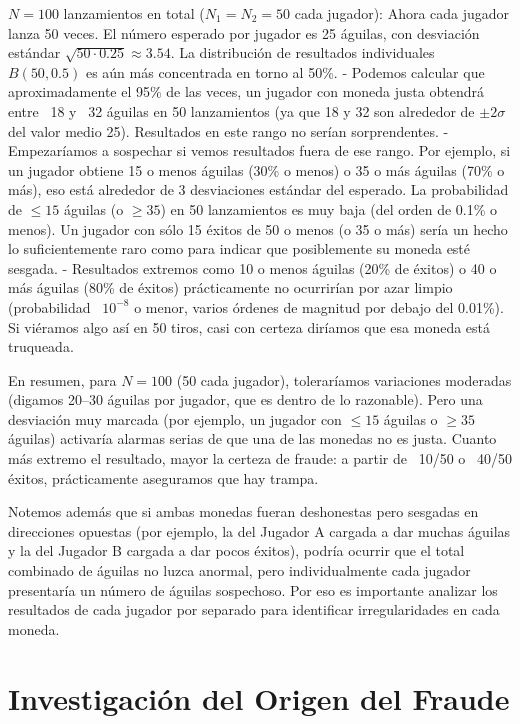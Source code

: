 \documentclass[11pt,letterpaper]{article}
\begin{document}
$N=100$ lanzamientos en total ($N_1=N_2=50$ cada jugador): Ahora cada jugador lanza 50 veces. El número esperado por jugador es 25 águilas, con desviación estándar $\sqrt{50 \cdot 0.25} \approx 3.54$. La distribución de resultados individuales $B(50,0.5)$ es aún más concentrada en torno al 50\%. 
    - Podemos calcular que aproximadamente el 95\% de las veces, un jugador con moneda justa obtendrá entre ~18 y ~32 águilas en 50 lanzamientos (ya que 18 y 32 son alrededor de $\pm2\sigma$ del valor medio 25). Resultados en este rango no serían sorprendentes.
    - Empezaríamos a sospechar si vemos resultados fuera de ese rango. Por ejemplo, si un jugador obtiene 15 o menos águilas (30\% o menos) o 35 o más águilas (70\% o más), eso está alrededor de 3 desviaciones estándar del esperado. La probabilidad de $\le15$ águilas (o $\ge35$) en 50 lanzamientos es muy baja (del orden de 0.1\% o menos). Un jugador con sólo 15 éxitos de 50 o menos (o 35 o más) sería un hecho lo suficientemente raro como para indicar que posiblemente su moneda esté sesgada.
    - Resultados extremos como 10 o menos águilas (20\% de éxitos) o 40 o más águilas (80\% de éxitos) prácticamente no ocurrirían por azar limpio (probabilidad ~$10^{-8}$ o menor, varios órdenes de magnitud por debajo del 0.01\%). Si viéramos algo así en 50 tiros, casi con certeza diríamos que esa moneda está truqueada.
    
    En resumen, para $N=100$ (50 cada jugador), toleraríamos variaciones moderadas (digamos 20–30 águilas por jugador, que es dentro de lo razonable). Pero una desviación muy marcada (por ejemplo, un jugador con $\le15$ águilas o $\ge35$ águilas) activaría alarmas serias de que una de las monedas no es justa. Cuanto más extremo el resultado, mayor la certeza de fraude: a partir de ~10/50 o ~40/50 éxitos, prácticamente aseguramos que hay trampa.

Notemos además que si ambas monedas fueran deshonestas pero sesgadas en direcciones opuestas (por ejemplo, la del Jugador A cargada a dar muchas águilas y la del Jugador B cargada a dar pocos éxitos), podría ocurrir que el total combinado de águilas no luzca anormal, pero individualmente cada jugador presentaría un número de águilas sospechoso. Por eso es importante analizar los resultados de cada jugador por separado para identificar irregularidades en cada moneda.

\section{Investigación del Origen del Fraude}
\end{document}
